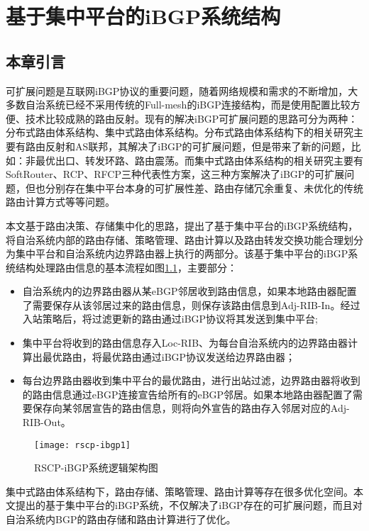 \chapter{基于集中平台的iBGP系统结构}
\label{cha:architecture}


\section{本章引言}
可扩展问题是互联网iBGP协议的重要问题，随着网络规模和需求的不断增加，大多数自治系统已经不采用传统的Full-mesh的iBGP连接结构，而是使用配置比较方便、技术比较成熟的路由反射。现有的解决iBGP可扩展问题的思路可分为两种：分布式路由体系结构、集中式路由体系结构。分布式路由体系结构下的相关研究主要有路由反射和AS联邦，其解决了iBGP的可扩展问题，但是带来了新的问题，比如：非最优出口、转发环路、路由震荡。而集中式路由体系结构的相关研究主要有SoftRouter、RCP、RFCP三种代表性方案，这三种方案解决了iBGP的可扩展问题，但也分别存在集中平台本身的可扩展性差、路由存储冗余重复、未优化的传统路由计算方式等等问题。

本文基于路由决策、存储集中化的思路，提出了基于集中平台的iBGP系统结构，将自治系统内部的路由存储、策略管理、路由计算以及路由转发交换功能合理划分为集中平台和自治系统内边界路由器上执行的两部分。该基于集中平台的iBGP系统结构处理路由信息的基本流程如图\ref{fig:rscp-ibgp1}，主要部分：
\begin{itemize}
  \item 自治系统内的边界路由器从某eBGP邻居收到路由信息，如果本地路由器配置了需要保存从该邻居过来的路由信息，则保存该路由信息到Adj-RIB-In。经过入站策略后，将过滤更新的路由通过iBGP协议将其发送到集中平台;
  \item 集中平台将收到的路由信息存入Loc-RIB、为每台自治系统内的边界路由器计算出最优路由，将最优路由通过iBGP协议发送给边界路由器；
  \item 每台边界路由器收到集中平台的最优路由，进行出站过滤，边界路由器将收到的路由信息通过eBGP连接宣告给所有的eBGP邻居。如果本地路由器配置了需要保存向某邻居宣告的路由信息，则将向外宣告的路由存入邻居对应的Adj-RIB-Out。
\end{itemize}

\begin{figure}
  \centering
  \texttt{[image: rscp-ibgp1]}
  \caption{RSCP-iBGP系统逻辑架构图}
  \label{fig:rscp-ibgp1}
\end{figure}

集中式路由体系结构下，路由存储、策略管理、路由计算等存在很多优化空间。本文提出的基于集中平台的iBGP系统，不仅解决了iBGP存在的可扩展问题，而且对自治系统内BGP的路由存储和路由计算进行了优化。

